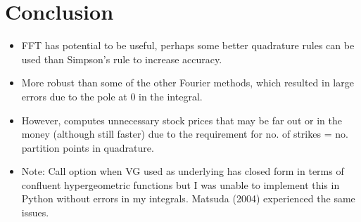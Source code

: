 \documentclass[11pt]{article}
\begin{document}
		\section{Conclusion}
			\begin{itemize}
				\item	FFT has potential to be useful, perhaps some better quadrature rules can be used than Simpson's rule to increase accuracy. 
				\item	More robust than some of the other Fourier methods, which resulted in large errors due to the pole at \( 0 \) in the integral.
				\item However, computes unnecessary stock prices that may be far out or in the money (although still faster) due to the requirement for no. of strikes = no. partition points in quadrature.
				\item Note: Call option when VG used as underlying has closed form in terms of confluent hypergeometric functions but I was unable to implement this in Python without errors in my integrals. Matsuda (2004) experienced the same issues.
			\end{itemize}
\end{document}
